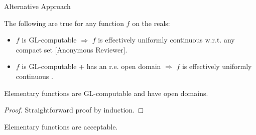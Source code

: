\begin{frame}{Alternative Approach}
    \pause
    \begin{theorem}
        The following are true for any function $f$ on the reals:
        \begin{itemize}
            \item 
            {$f$ is GL-computable $\Rightarrow$ $f$ is effectively uniformly continuous w.r.t.\null{} any compact set [Anonymous Reviewer].}
            \pause \item 
            {$f$ is GL-computable + has an r.e. open domain $\Rightarrow$ $f$ is effectively uniformly continuous \citep{pauly2016}.}
        \end{itemize}

    \end{theorem}
    \pause
    \begin{theorem}
            Elementary functions are GL-computable and have open domains.
    \end{theorem}
    \pause
    \begin{proof}
            Straightforward proof by induction.
    \end{proof}
    \pause
    \begin{corollary}
            Elementary functions are acceptable.
    \end{corollary}
\end{frame}